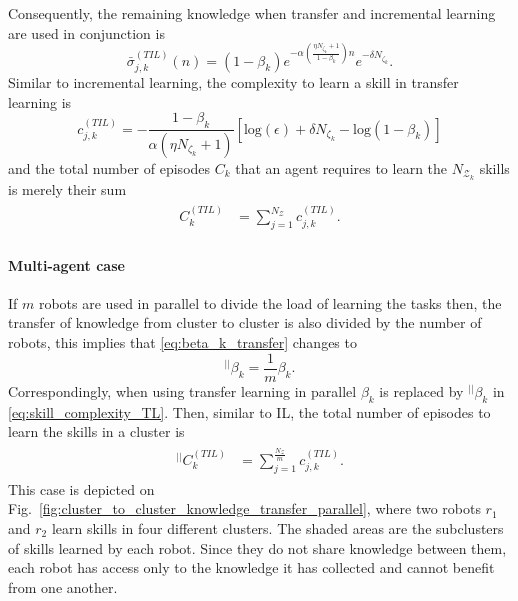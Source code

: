 Consequently, the remaining knowledge when transfer and incremental learning are used in conjunction is
\begin{equation}\label{eq:remaining_knowledge__ITL}
	\bar{\sigma}^{(TIL)}_{j,k}(n) = \left(1- \beta_k\right) e^{-\alpha  \left(\frac{ \eta N_{\zeta_k}+1}{1 - \beta_k}\right) n} e^{-\delta N_{\zeta_k}}.
\end{equation}
Similar to incremental learning, the complexity to learn a skill in transfer learning is
\begin{equation}\label{eq:skill_complexity_TL}
	c^{(TIL)}_{j,k} = -\frac{1 - \beta_{k}}{\alpha (\eta N_{\zeta_k}+ 1)}\left[\text{log}(\epsilon) + \delta N_{\zeta_k} - \text{log}(1 - \beta_{k})\right]
\end{equation}
and the total number of episodes  $ C_k $ that an agent requires to learn the $N_{\mathcal{Z}_k}$ skills is merely their sum
\begin{align}\label{eq:total_episodes_transfer}
	\begin{split}
		C^{(TIL)}_k &= \sum^{N_{\mathcal{Z}}}_{j=1} c^{(TIL)}_{j,k}.
	\end{split}
\end{align}

\paragraph*{Multi-agent case}
If $m$ robots are used in parallel to divide the load of learning the tasks then, the transfer of knowledge from cluster to cluster is also divided by the number of robots, this implies that \eqref{eq:beta_k_transfer} changes to
\begin{equation}\label{eq:beta_k_transfer_parallel}
	{}^{\lvert \rvert}\beta_{k}= \frac{1}{m}\beta_{k}.
\end{equation}
Correspondingly, when using transfer learning in parallel $\beta_k$ is replaced by ${}^{\lvert \rvert}\beta_{k}$ in \eqref{eq:skill_complexity_TL}. Then, similar to IL, the total number of episodes to learn the skills in a cluster is
\begin{align}
	\begin{split}
		{}^{\lvert \rvert}C^{(TIL)}_k &= \sum^{\frac{N_{\mathcal{Z}}}{m}}_{j=1} c^{(TIL)}_{j,k}.
	\end{split}
\end{align}
This case is depicted on Fig.~\ref{fig:cluster_to_cluster_knowledge_transfer_parallel}, where two robots $ r_1$ and $r_2$ learn skills in four different clusters. The shaded areas are the subclusters of skills learned by each robot. Since they do not share knowledge between them, each robot has access only to the knowledge it has collected and cannot benefit from one another. 

